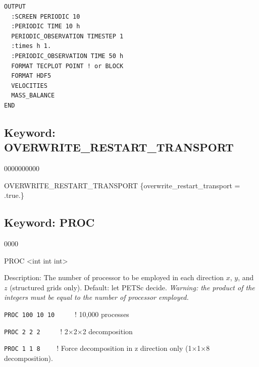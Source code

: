 \documentclass[12pt]{article}
\begin{document}
\begin{mdframed}


\begin{verbatim}
OUTPUT
  :SCREEN PERIODIC 10
  :PERIODIC TIME 10 h
  PERIODIC_OBSERVATION TIMESTEP 1
  :times h 1.
  :PERIODIC_OBSERVATION TIME 50 h
  FORMAT TECPLOT POINT ! or BLOCK
  FORMAT HDF5
  VELOCITIES
  MASS_BALANCE
END
\end{verbatim}
\end{mdframed}

\hyperlink{target_key}{\return}


\newpage
\protect\hypertarget{target_overwrite}{}

\subsection{Keyword: OVERWRITE\_RESTART\_TRANSPORT}
\begin{deflist}{0000000000}
\item[OVERWRITE\_RESTART\_TRANSPORT] \{overwrite\_restart\_transport = .true.\}
\end{deflist}

\hyperlink{target_key}{\return}


\newpage
\protect\hypertarget{target_proc}{}

\subsection{Keyword: PROC}

\begin{deflist}{0000}
\item[PROC] <int int int> 
\item[Description:] The number of processor to be employed in each direction $x$, $y$, and $z$ (structured grids only). Default: let PETSc decide. {\em Warning: the product of the integers must be equal to the number of processor employed.}
\end{deflist}

\begin{mdframed}


{\tt PROC 100 10 10} \ \ \ \ \ ! 10,000 processes

{\tt PROC 2 2 2} \ \ \ \ \ ! 2$\times$2$\times$2 decomposition

{\tt PROC 1 1 8} \ \ \ \ ! Force decomposition in z direction only (1$\times$1$\times$8 decomposition).

\end{mdframed}
\end{document}
